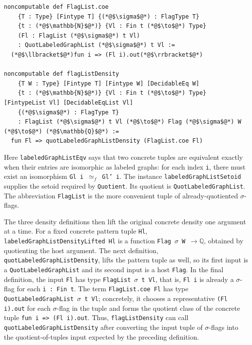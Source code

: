 \documentclass{article}
\newcommand{\lean}[1]{\texttt{#1}}
\begin{document}
\begin{lstlisting}
noncomputable def FlagList.coe
    {T : Type} [Fintype T] {(*@$\sigma$@*) : FlagType T}
    {t : (*@$\mathbb{N}$@*)} {Vl : Fin t (*@$\to$@*) Type}
    (Fl : FlagList (*@$\sigma$@*) t Vl)
    : QuotLabeledGraphList (*@$\sigma$@*) t Vl :=
  (*@$\llbracket$@*)fun i => (Fl i).out(*@$\rrbracket$@*)

noncomputable def flagListDensity
    {T W : Type} [Fintype T] [Fintype W] [DecidableEq W]
    {t : (*@$\mathbb{N}$@*)} {Vl : Fin t (*@$\to$@*) Type} [FintypeList Vl] [DecidableEqList Vl]
    {(*@$\sigma$@*) : FlagType T}
    : FlagList (*@$\sigma$@*) t Vl (*@$\to$@*) Flag (*@$\sigma$@*) W (*@$\to$@*) (*@$\mathbb{Q}$@*) :=
  fun Fl => quotLabeledGraphListDensity (FlagList.coe Fl)
\end{lstlisting}
Here \lean{labeledGraphListEqv} says that two concrete tuples are equivalent exactly
when their entries are isomorphic as labeled graphs: for each index \lean{i},
there must exist an isomorphism \lean{Gl i}~\(\simeq_f\)~\lean{Gl' i}.  The
instance \lean{labeledGraphListSetoid} supplies the setoid required by
\lean{Quotient}.  Its quotient is \lean{QuotLabeledGraphList}.  The
abbreviation \lean{FlagList} is the more convenient tuple of already-quotiented
$\sigma$-flags.

The three density definitions then lift the original concrete density one
argument at a time.  For a fixed concrete pattern tuple \lean{Hl},
\lean{labeledGraphListDensityLifted Hl} is a function
\lean{Flag}~$\sigma$~\lean{W}~\(\to \mathbb{Q}\), obtained by quotienting the
host argument.  The next definition, \lean{quotLabeledGraphListDensity},
lifts the pattern tuple as well, so its first input is a
\lean{QuotLabeledGraphList} and its second input is a host \lean{Flag}.  In
the final definition, the input \lean{Fl} has type
\lean{FlagList}~$\sigma$~\lean{t Vl}, that is, \lean{Fl i} is already a $\sigma$-flag
for each \lean{i : Fin t}.  The term
\lean{FlagList.coe Fl} has type
\lean{QuotLabeledGraphList}~$\sigma$~\lean{t Vl}; concretely, it chooses a
representative \lean{(Fl i).out} for each $\sigma$-flag in the tuple and forms the
quotient class of the concrete tuple \lean{fun i => (Fl i).out}.  Thus,
\lean{flagListDensity} can call
\lean{quotLabeledGraphListDensity} after converting the
input tuple of $\sigma$-flags into the quotient-of-tuples input expected by the
preceding definition.
\end{document}
